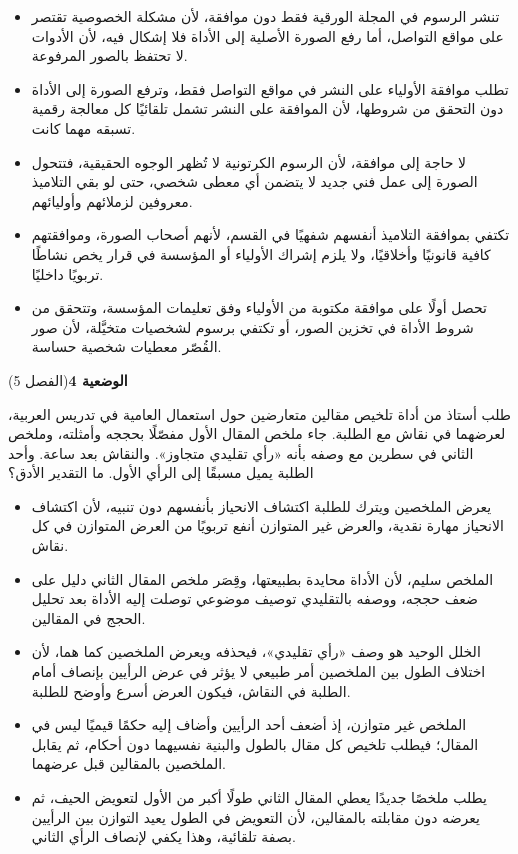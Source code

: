 \documentclass[11pt,a4paper]{article}
\begin{document}
\begin{itemize}[leftmargin=1.0cm, labelsep=6pt, itemsep=3pt, topsep=4pt, parsep=0pt]
  \item[\textbf{أ)}] تنشر الرسوم في المجلة الورقية فقط دون موافقة، لأن مشكلة الخصوصية تقتصر على مواقع التواصل، أما رفع الصورة الأصلية إلى الأداة فلا إشكال فيه، لأن الأدوات لا تحتفظ بالصور المرفوعة.
  \item[\textbf{ب)}] تطلب موافقة الأولياء على النشر في مواقع التواصل فقط، وترفع الصورة إلى الأداة دون التحقق من شروطها، لأن الموافقة على النشر تشمل تلقائيًا كل معالجة رقمية تسبقه مهما كانت.
  \item[\textbf{ج)}] لا حاجة إلى موافقة، لأن الرسوم الكرتونية لا تُظهر الوجوه الحقيقية، فتتحول الصورة إلى عمل فني جديد لا يتضمن أي معطى شخصي، حتى لو بقي التلاميذ معروفين لزملائهم وأوليائهم.
  \item[\textbf{د)}] تكتفي بموافقة التلاميذ أنفسهم شفهيًا في القسم، لأنهم أصحاب الصورة، وموافقتهم كافية قانونيًا وأخلاقيًا، ولا يلزم إشراك الأولياء أو المؤسسة في قرار يخص نشاطًا تربويًا داخليًا.
  \item[\textbf{هـ)}] تحصل أولًا على موافقة مكتوبة من الأولياء وفق تعليمات المؤسسة، وتتحقق من شروط الأداة في تخزين الصور، أو تكتفي برسوم لشخصيات متخيَّلة، لأن صور القُصّر معطيات شخصية حساسة.
\end{itemize}
\par\vspace{6pt}
\noindent
{\large\khatt\textbf{الوضعية 4}}\hfill{\small(الفصل 5)}\par\nopagebreak\vspace{3pt}
\setlength{\fboxsep}{7pt}\colorbox{gray!10}{\parbox{\dimexpr\linewidth-14pt}{طلب أستاذ من أداة تلخيص مقالين متعارضين حول استعمال العامية في تدريس العربية، لعرضهما في نقاش مع الطلبة. جاء ملخص المقال الأول مفصّلًا بحججه وأمثلته، وملخص الثاني في سطرين مع وصفه بأنه «رأي تقليدي متجاوز». والنقاش بعد ساعة. وأحد الطلبة يميل مسبقًا إلى الرأي الأول. ما التقدير الأدق؟}}\par\nopagebreak
\begin{itemize}[leftmargin=1.0cm, labelsep=6pt, itemsep=3pt, topsep=4pt, parsep=0pt]
  \item[\textbf{أ)}] يعرض الملخصين ويترك للطلبة اكتشاف الانحياز بأنفسهم دون تنبيه، لأن اكتشاف الانحياز مهارة نقدية، والعرض غير المتوازن أنفع تربويًا من العرض المتوازن في كل نقاش.
  \item[\textbf{ب)}] الملخص سليم، لأن الأداة محايدة بطبيعتها، وقِصَر ملخص المقال الثاني دليل على ضعف حججه، ووصفه بالتقليدي توصيف موضوعي توصلت إليه الأداة بعد تحليل الحجج في المقالين.
  \item[\textbf{ج)}] الخلل الوحيد هو وصف «رأي تقليدي»، فيحذفه ويعرض الملخصين كما هما، لأن اختلاف الطول بين الملخصين أمر طبيعي لا يؤثر في عرض الرأيين بإنصاف أمام الطلبة في النقاش، فيكون العرض أسرع وأوضح للطلبة.
  \item[\textbf{د)}] الملخص غير متوازن، إذ أضعف أحد الرأيين وأضاف إليه حكمًا قيميًا ليس في المقال؛ فيطلب تلخيص كل مقال بالطول والبنية نفسيهما دون أحكام، ثم يقابل الملخصين بالمقالين قبل عرضهما.
  \item[\textbf{هـ)}] يطلب ملخصًا جديدًا يعطي المقال الثاني طولًا أكبر من الأول لتعويض الحيف، ثم يعرضه دون مقابلته بالمقالين، لأن التعويض في الطول يعيد التوازن بين الرأيين بصفة تلقائية، وهذا يكفي لإنصاف الرأي الثاني.
\end{itemize}
\end{document}
